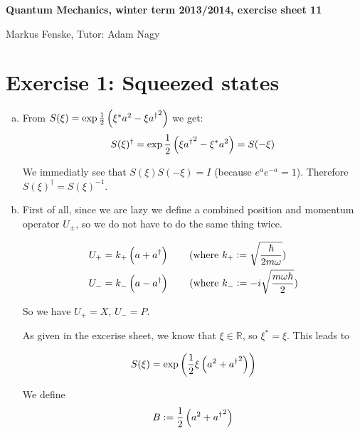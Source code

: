 \documentclass[a4paper,german,12pt,smallheadings]{scrartcl}
\begin{document}
\allowdisplaybreaks %
\begin{center}
\bfseries %
\sffamily %
\vspace{-40pt}
Quantum Mechanics, winter term 2013/2014, exercise sheet 11

Markus Fenske, Tutor: Adam Nagy
\vspace{-10pt}
\end{center}

\section*{Exercise 1: Squeezed states}
\begin{enumerate}[a)]
  \item
    From $S(\xi) = \exp \frac{1}{2} \del{\xi^* a^2 - \xi {a^\dagger}^2}$ we get:
    \begin{align*}
      S(\xi)^\dagger = \exp \frac{1}{2} \del{\xi {a^\dagger}^2 - \xi^* a^2} = S(-\xi)
    \end{align*}

    We immediatly see that $S(\xi)S(-\xi) = I$ (because $e^a e^{-a} = 1$).
    Therefore $S(\xi)^\dagger = S(\xi)^{-1}$.
  \item
    First of all, since we are lazy we define a combined position and momentum
    operator $U_\pm$, so we do not have to do the same thing twice.

    \begin{align*}
      U_+ &= k_+ \del{a + a^\dagger} \qquad \text{(where $k_+ := \sqrt{\frac{\hbar}{2 m \omega}}$)} \\
      U_- &= k_- \del{a - a^\dagger} \qquad \text{(where $k_- := -i\sqrt{\frac{m \omega \hbar}{2}}$)} \\
    \end{align*}

    So we have $U_+ = X$, $U_- = P$.

    As given in the excerise sheet, we know that $\xi \in \mathbb{R}$, so
    $\xi^* = \xi$. This leads to

    \begin{align*}
      S(\xi) = \exp\del{\frac{1}{2} \xi \del{a^2 + {a^\dagger}^2}}
    \end{align*}

    We define
    \begin{align*}
      B := \frac{1}{2} \del{a^2 + {a^\dagger}^2}
    \end{align*}


\end{enumerate}
\end{document}
